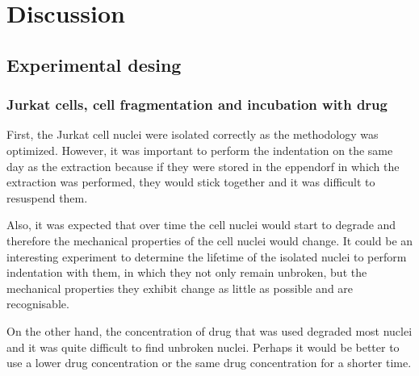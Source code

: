 \documentclass[12pt, a4paper]{article} %
\begin{document}
\newpage


\section{Discussion}

\subsection{Experimental desing}

\subsubsection{Jurkat cells, cell fragmentation and incubation with drug}

\setlength{\parskip}{0mm}

First, the Jurkat cell nuclei were isolated correctly as the methodology was optimized. However, it was important to perform the indentation on the same day as the extraction because if they were stored in the eppendorf in which the extraction was performed, they would stick together and it was difficult to resuspend them.

\setlength{\parskip}{4mm} 

Also, it was expected that over time the cell nuclei would start to degrade and therefore the mechanical properties of the cell nuclei would change. It could be an interesting experiment to determine the lifetime of the isolated nuclei to perform indentation with them, in which they not only remain unbroken, but the mechanical properties they exhibit change as little as possible and are recognisable.

On the other hand, the concentration of drug that was used degraded most nuclei and it was quite difficult to find unbroken nuclei. Perhaps it would be better to use a lower drug concentration or the same drug concentration for a shorter time. 

\end{document}
